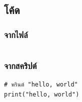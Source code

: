 \documentclass{article}
\begin{document}
\pagebreak[4]
\subsection{โค้ด}
\subsubsection{จากไฟล์}
\begin{listing}[!ht]
\inputminted{python}{sources/fibo.py}
\caption{โค้ดจากไฟล์}
\end{listing}

\subsubsection{จากสคริปต์}
\begin{listing}[!ht]
\begin{verbatim}
# พรินต์ "hello, world"
print("hello, world")
\end{verbatim}
\caption{โค้ดจากสคริปต์}
\end{listing}

\newpage
{}
\listoffigures
\listoftables
\listoflistings
\end{document}
